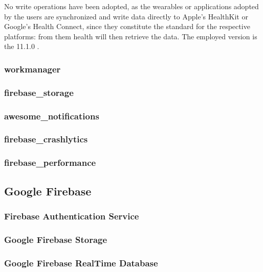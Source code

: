 \noindent No write operations have been adopted, as the wearables or applications adopted by the users are synchronized and write data directly to Apple's HealthKit or Google's Health Connect, since they constitute the standard for the respective platforms: from them health will then retrieve the data. The employed version is the 11.1.0 \cite{Health}.

\subsubsection{workmanager}

\subsubsection{firebase\_storage}
\subsubsection{awesome\_notifications}

\subsubsection{firebase\_crashlytics}
\subsubsection{firebase\_performance}

\subsection{Google Firebase}
\subsubsection{Firebase Authentication Service}
\subsubsection{Google Firebase Storage}
\subsubsection{Google Firebase RealTime Database}
